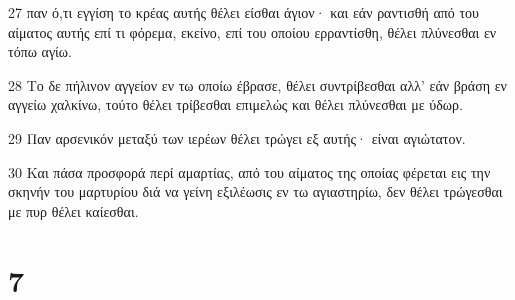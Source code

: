 \par 27 παν ό,τι εγγίση το κρέας αυτής θέλει είσθαι άγιον· και εάν ραντισθή από του αίματος αυτής επί τι φόρεμα, εκείνο, επί του οποίου ερραντίσθη, θέλει πλύνεσθαι εν τόπω αγίω.
\par 28 Το δε πήλινον αγγείον εν τω οποίω έβρασε, θέλει συντρίβεσθαι αλλ' εάν βράση εν αγγείω χαλκίνω, τούτο θέλει τρίβεσθαι επιμελώς και θέλει πλύνεσθαι με ύδωρ.
\par 29 Παν αρσενικόν μεταξύ των ιερέων θέλει τρώγει εξ αυτής· είναι αγιώτατον.
\par 30 Και πάσα προσφορά περί αμαρτίας, από του αίματος της οποίας φέρεται εις την σκηνήν του μαρτυρίου διά να γείνη εξιλέωσις εν τω αγιαστηρίω, δεν θέλει τρώγεσθαι με πυρ θέλει καίεσθαι.

\chapter{7}

